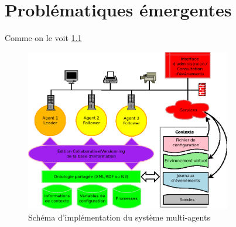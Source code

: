 \chapter{Problématiques émergentes}

Comme on le voit \ref{archi}

\begin{figure}[ht!]
  \centering
  \includegraphics[width=90mm]{img/archi}
  \caption{Schéma d'implémentation du système multi-agents}
  \label{archi}
\end{figure}
